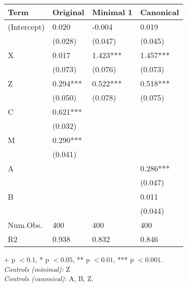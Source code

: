 \begin{longtable}{@{}p{\dimexpr(\textwidth - 6\tabcolsep)/4\relax}p{\dimexpr(\textwidth - 6\tabcolsep)/4\relax}p{\dimexpr(\textwidth - 6\tabcolsep)/4\relax}p{\dimexpr(\textwidth - 6\tabcolsep)/4\relax}@{}}
\toprule
Term & Original & Minimal 1 & Canonical \\
\midrule
\textnormal{(Intercept)} & 0.020 & -0.004 & 0.019 \\
\textnormal{} & (0.028) & (0.047) & (0.045) \\
\textnormal{X} & 0.017 & 1.423*** & 1.457*** \\
\textnormal{} & (0.073) & (0.076) & (0.073) \\
\textnormal{Z} & 0.294*** & 0.522*** & 0.518*** \\
\textnormal{} & (0.050) & (0.078) & (0.075) \\
\textnormal{C} & 0.621*** &  &  \\
\textnormal{} & (0.032) &  &  \\
\textnormal{M} & 0.290*** &  &  \\
\textnormal{} & (0.041) &  &  \\
\textnormal{A} &  &  & 0.286*** \\
\textnormal{} &  &  & (0.047) \\
\textnormal{B} &  &  & 0.011 \\
\textnormal{} &  &  & (0.044) \\
\midrule[\heavyrulewidth]
\textnormal{Num.Obs.} & 400 & 400 & 400 \\
\textnormal{R2} & 0.938 & 0.832 & 0.846 \\
\bottomrule
\end{longtable}
\endgroup
\par\endgroup
{\footnotesize + p $< 0.1$, * p $< 0.05$, ** p $< 0.01$, *** p $< 0.001$.\\
\hspace*{1.5em}\textit{Controls (minimal):} {Z}\\
\hspace*{1.5em}\textit{Controls (canonical):} {A, B, Z}.}
\endgroup
